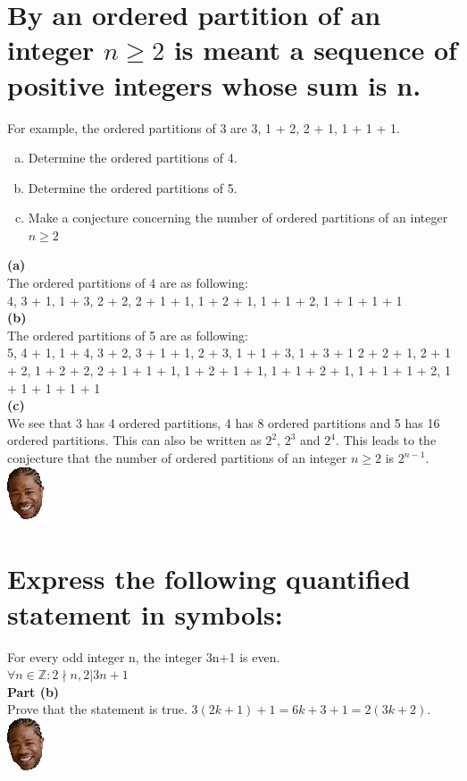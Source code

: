 \section{By an ordered partition of an integer $n\geq 2$ is meant a sequence of positive integers whose sum is n.}
For example, the ordered partitions of 3 are 3, 1 + 2, 2 + 1, 1 + 1 + 1.
\begin{enumerate}[(a)]
\item Determine the ordered partitions of 4.
\item Determine the ordered partitions of 5.
\item Make a conjecture concerning the number of ordered partitions of an integer $n\geq 2$
\end{enumerate}
\textbf{\Large(a)}\\
The ordered partitions of 4 are as following: \\
4,
 3 + 1, 1 + 3,
  2 + 2, 2 + 1 + 1, 1 + 2 + 1, 1 + 1 + 2,
   1 + 1 + 1 + 1\\
\textbf{\Large(b)}\\
The ordered partitions of 5 are as following: \\
5,
 4 + 1, 1 + 4,
  3 + 2, 3 + 1 + 1, 2 + 3, 1 + 1 + 3, 1 + 3 + 1
   2 + 2 + 1, 2 + 1 + 2, 1 + 2 + 2, 2 + 1 + 1 + 1, 1 + 2 + 1 + 1, 1 + 1 + 2 + 1, 1 + 1 + 1 + 2,
    1 + 1 + 1 + 1 + 1\\
\textbf{\Large(c)}\\
We see that 3 has 4 ordered partitions, 4 has 8 ordered partitions and 5 has 16 ordered partitions. This can also be written as $2^2$, $2^3$ and $2^4$. This leads to the conjecture that the number of ordered partitions of an integer $n\geq 2$ is $2^{n-1}$.\includegraphics[scale=0.70]{billeder/xzibit}


\section{Express the following quantified statement in symbols:}
For every odd integer n, the integer 3n+1 is even.\\
$\forall n\in \mathbb{Z} : 2\nmid n , 2|3n+1$\\
\textbf{Part (b)} \\
Prove that the statement is true.
$3(2k+1)+1 = 6k +3 +1 = 2(3k+2)$.\includegraphics[scale=0.70]{billeder/xzibit}


